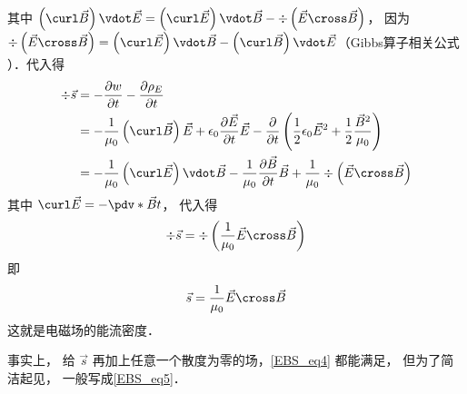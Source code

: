 其中 $\left( {\curl \vec B} \right) \vdot \vec E = \left( {\curl \vec E} \right) \vdot \vec B - \div \left( {\vec E \cross \vec B} \right)$， 因为 $\div \left( {\vec E \cross \vec B} \right) = \left( {\curl \vec E} \right) \vdot \vec B - \left( {\curl \vec B} \right) \vdot \vec E$（Gibbs算子相关公式%
）．代入得
\begin{equation}
\begin{aligned}
\div \vec s &=  - \frac{{\partial w}}{{\partial t}} - \frac{{\partial {\rho _E}}}{{\partial t}}\\
&=  - \frac{1}{{{\mu _0}}}\left( {\curl \vec B} \right)\vec E + {\epsilon _0}\frac{{\partial \vec E}}{{\partial t}}\vec E - \frac{\partial }{{\partial t}}\left( {\frac{1}{2}{\epsilon _0}{{\vec E}^2} + \frac{1}{2}\frac{{{{\vec B}^2}}}{{{\mu _0}}}} \right)\\
&=  - \frac{1}{{{\mu _0}}}\left( {\curl \vec E} \right) \vdot \vec B - \frac{1}{{{\mu _0}}}\frac{{\partial \vec B}}{{\partial t}}\vec B + \frac{1}{{{\mu _0}}}\div \left( {\vec E \cross \vec B} \right)
\end{aligned}
\end{equation} 
其中 $\curl \vec E =  -\pdv*{\vec B}{t}$， 代入得
\begin{equation}\label{EBS_eq4}
\div \vec s = \div \left( {\frac{1}{{{\mu _0}}}\vec E \cross \vec B} \right)
\end{equation} 
即
\begin{equation}\label{EBS_eq5}
\vec s = \frac{1}{{{\mu _0}}}\vec E \cross \vec B
\end{equation} 
这就是电磁场的能流密度．

事实上， 给 $\vec s$ 再加上任意一个散度为零的场，\autoref{EBS_eq4} 都能满足， 但为了简洁起见， 一般写成\autoref{EBS_eq5}． 





